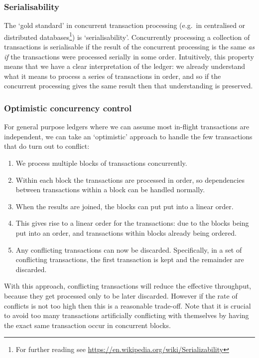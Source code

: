 \documentclass[11pt,a4paper]{article}
\begin{document}
\subsubsection{Serialisability}
The `gold standard' in concurrent transaction processing (e.g.~in centralised
or distributed databases\footnote{For further reading see
\url{https://en.wikipedia.org/wiki/Serializability}}) is `serialisability'.
Concurrently processing a collection of transactions is serialisable if the
result of the concurrent processing is the same \emph{as if} the transactions
were processed serially in some order. Intuitively, this property means that we
have a clear interpretation of the ledger: we already understand what it means
to process a series of transactions in order, and so if the concurrent
processing gives the same result then that understanding is preserved.

\subsubsection{Optimistic concurrency control}
For general purpose ledgers where we can assume most in-flight transactions are
independent, we can take an `optimistic' approach to handle the few transactions
that do turn out to conflict:
\begin{enumerate}
\item We process multiple blocks of transactions concurrently.
\item Within each block the transactions are processed in order, so dependencies
      between transactions within a block can be handled normally.
\item When the results are joined, the blocks can put put into a linear order.
\item This gives rise to a linear order for the transactions: due to the blocks
      being put into an order, and transactions within blocks already being
      ordered.
\item Any conflicting transactions can now be discarded. Specifically, in a set
      of conflicting transactions, the first transaction is kept and the
      remainder are discarded.
\end{enumerate}
With this approach, conflicting transactions will reduce the effective
throughput, because they get processed only to be later discarded. However if
the rate of conflicts is not too high then this is a reasonable trade-off. Note
that it is crucial to avoid too many transactions artificially conflicting with
themselves by having the exact same transaction occur in concurrent blocks.
\end{document}
